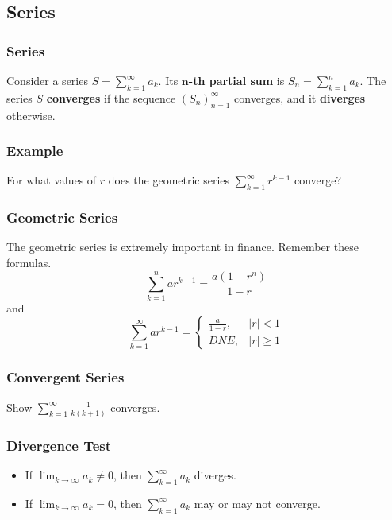 \documentclass{beamer}
\begin{document}
\subsection{Series}

\begin{frame}
\frametitle{Series}
\begin{Definition}
Consider a series $\displaystyle S = \sum_{k = 1}^\infty a_k$. Its {\bf $\boldsymbol n$-th partial sum} is $\displaystyle S_n = \sum_{k = 1}^n a_k$. The series $S$ {\bf converges} if the sequence $(S_n)_{n = 1}^\infty$ converges, and it {\bf diverges} otherwise.
 \end{Definition}
 \end{frame}
 
 \begin{frame}[t]
 \frametitle{Example}
 \begin{Example}
 For what values of $r$ does the geometric series $\displaystyle\sum_{k = 1}^\infty r^{k - 1}$ converge?
 \end{Example}
 \end{frame}
 
 \begin{frame}
 \frametitle{Geometric Series}
 The geometric series is extremely important in finance. Remember these formulas. 
 $$
 \sum_{k= 1}^n a r^{k -1} = \frac{a(1 - r^n)}{1 - r}
 $$
 and
 $$
  \sum_{k = 1}^\infty a r^{k -1} =\begin{cases} \frac{a}{1 - r}, & |r| < 1\\ DNE,	& |r| \geq 1\end{cases}
 $$
  \end{frame}
  
  \begin{frame}[t]
   \frametitle{Convergent Series}
   \begin{Example}
   Show $\displaystyle\sum_{k = 1}^\infty \frac{1}{k(k + 1)}$ converges. 
   \end{Example}
  
  \end{frame}
 
 \begin{frame}
 \frametitle{Divergence Test}
 \begin{itemize}
\item If $\displaystyle\lim_{k\to\infty} a_k \neq 0$, then $\displaystyle\sum_{k = 1}^\infty a_k$ diverges.  
\item If $\displaystyle\lim_{k\to\infty} a_k =  0$, then $\displaystyle\sum_{k = 1}^\infty a_k$ may or may not converge.
\end{itemize}
 \end{frame}
 
\end{document}
